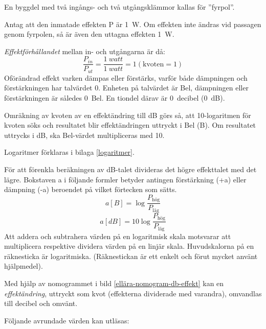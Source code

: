 En byggdel med två ingångs- och två utgångsklämmor kallas för ''fyrpol''.



Antag att den inmatade effekten P är 1~W.
Om effekten inte ändras vid passagen genom fyrpolen, så är även den uttagna
effekten 1~W.

\emph{Effektförhållandet} mellan in- och utgångarna är då:
\[\dfrac{P_{in}}{P_{ut}} = \dfrac{1\ \textit{watt}}{1\ \textit{watt}} = 1 (\text{kvoten} = 1)\]
Oförändrad effekt varken dämpas eller förstärks, varför både dämpningen och
förstärkningen har talvärdet 0.
Enheten på talvärdet är Bel, dämpningen eller förstärkningen är således 0~Bel.
En tiondel därav är 0~decibel (0~dB).

Omräkning av kvoten av en effektändring till dB görs så, att 10-logaritmen för
kvoten söks och resultatet blir effektändringen uttryckt i Bel (B). Om
resultatet uttrycks i dB, ska Bel-värdet multipliceras med 10.

Logaritmer förklaras i bilaga \ref{logaritmer}.

För att förenkla beräkningen av dB-talet divideras det högre effekttalet med det
lägre.
Bokstaven a i följande formler betyder antingen förstärkning (+a) eller
dämpning (-a) beroendet på vilket förtecken som sätts.
\[a[B] = \log \dfrac{P_\text{hög}}{P_\text{låg}}\]
\[a[dB] = 10\log \dfrac{P_\text{hög}}{P_\text{låg}}\]
Att addera och subtrahera värden på en logaritmisk skala motsvarar att
multiplicera respektive dividera värden på en linjär skala.
Huvudskalorna på en räknesticka är logaritmiska.
(Räknestickan är ett enkelt och förut mycket använt hjälpmedel).

Med hjälp av nomogrammet i bild \ref{ellära-nomogram-db-effekt} kan en
\emph{effektändring}, uttryckt som kvot (effekterna dividerade med varandra),
omvandlas till decibel och omvänt.


Följande avrundade värden kan utläsas:

